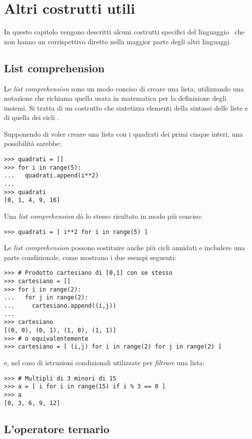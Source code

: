 \chapter{Altri costrutti utili}
\label{altri-costrutti-utili}

In questo capitolo vengono descritti alcuni costrutti specifici del
linguaggio \python\ che non hanno un corrispettivo diretto nella
maggior parte degli altri linguaggi.

\section{List comprehension}

Le \textit{list comprehension} sono un
modo conciso di creare una lista, utilizzando una notazione che
richiama quella usata in matematica per la definizione degli insiemi.
Si tratta di un costrutto che sintetizza elementi della sintassi delle
liste e di quella dei cicli .

Supponendo di voler creare una lista con i quadrati dei primi cinque
interi, una possibilit\`a sarebbe:
\begin{verbatim}
>>> quadrati = []
>>> for i in range(5):
...   quadrati.append(i**2)
...
>>> quadrati
[0, 1, 4, 9, 16]
\end{verbatim}
Una \textit{list comprehension} d\`a lo stesso risultato
in modo pi\`u conciso:
\begin{verbatim}
>>> quadrati = [ i**2 for i in range(5) ]
\end{verbatim}
Le \textit{list comprehension} possono sostituire anche pi\`u cicli
annidati e includere una parte condizionale, come mostrano i due
esempi seguenti:
\begin{verbatim}
>>> # Prodotto cartesiano di [0,1] con se stesso
>>> cartesiano = []
>>> for i in range(2):
...   for j in range(2):
...     cartesiano.append((i,j))
...
>>> cartesiano
[(0, 0), (0, 1), (1, 0), (1, 1)]
>>> # o equivalentemente
>>> cartesiano = [ (i,j) for i in range(2) for j in range(2) ]
\end{verbatim}
e, nel caso di istruzioni condizionali utilizzate per \emph{filtrare}
una lista:
\begin{verbatim}
>>> # Multipli di 3 minori di 15 
>>> a = [ i for i in range(15) if i % 3 == 0 ]
>>> a
[0, 3, 6, 9, 12]
\end{verbatim}

\section{L'operatore ternario}

